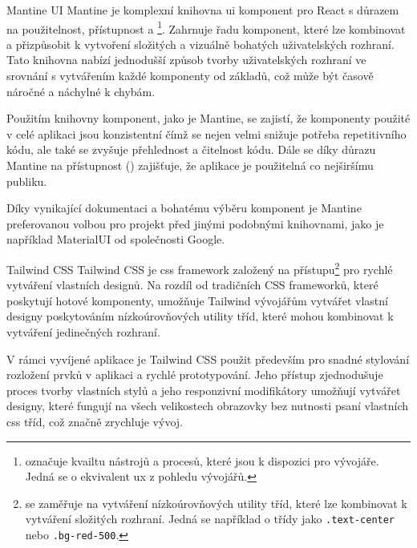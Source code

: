 \begin{subsection}{Mantine UI}
    \label{subsec:implementace-technologie-mantine}
    Mantine je komplexní knihovna \ac{ui} komponent pro React s důrazem na použitelnost, přístupnost a \footnote{ označuje kvailtu nástrojů a procesů, které jsou k dispozici pro vývojáře.
    Jedná se o ekvivalent \acl{ux} z pohledu vývojářů.}.
    Zahrnuje řadu komponent, které lze kombinovat a přizpůsobit k vytvoření složitých a vizuálně bohatých uživatelských rozhraní.
    Tato knihovna nabízí jednodušší způsob tvorby uživatelských rozhraní ve srovnání s vytvářením každé komponenty od základů, což může být časově náročné a náchylné k chybám.

    Použitím knihovny komponent, jako je Mantine, se zajistí, že komponenty použité v celé aplikaci jsou konzistentní čímž se nejen velmi snižuje potřeba repetitivního kódu, ale také se zvyšuje přehlednost a čitelnost kódu.
    Dále se díky důrazu Mantine na přístupnost () zajišťuje, že aplikace je použitelná co nejširšímu publiku\cite{m__mantine_dev}.

    Díky vynikající dokumentaci a bohatému výběru komponent je Mantine preferovanou volbou pro projekt před jinými podobnými knihovnami, jako je například MaterialUI od společnosti Google\cite{m__mui_com}.
\end{subsection}

\begin{subsection}{Tailwind CSS}
    \label{subsec:implementace-technologie-tailwind}
    Tailwind CSS je \ac{css} framework založený na  přístupu\footnote{ se zaměřuje na vytváření nízkoúrovňových utility tříd, které lze kombinovat k vytváření složitých rozhraní.
    Jedná se například o třídy jako \texttt{.text-center} nebo \texttt{.bg-red-500}.} pro rychlé vytváření vlastních designů.
    Na rozdíl od tradičních CSS frameworků, které poskytují hotové komponenty, umožňuje Tailwind vývojářům vytvářet vlastní designy poskytováním nízkoúrovňových utility tříd, které mohou kombinovat k vytváření jedinečných rozhraní\cite{tc__tailwindcss_com}.

    V rámci vyvíjené aplikace je Tailwind CSS použit především pro snadné stylování rozložení prvků v aplikaci a rychlé prototypování.
    Jeho  přístup zjednodušuje proces tvorby vlastních stylů a jeho responzivní modifikátory umožňují vytvářet designy, které fungují na všech velikostech obrazovky bez nutnosti psaní vlastních \ac{css} tříd\cite{tc__tailwindcss_com}, což značně zrychluje vývoj.
\end{subsection}

